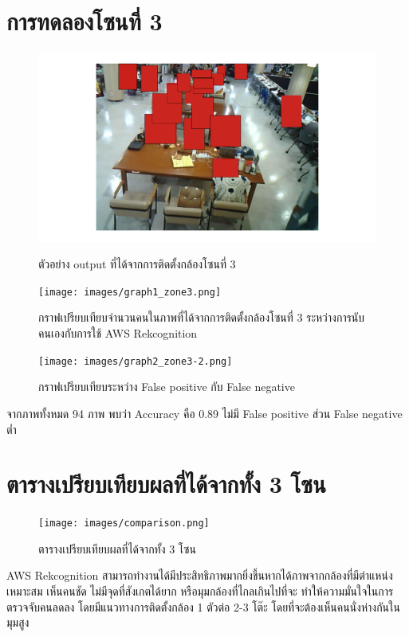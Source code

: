 \section{การทดลองโซนที่ 3}
\begin{figure}[ht]
    \centering
    \includegraphics[width=\textwidth]{images/modified_ESP32-CAM(27).png}
    \caption[ตัวอย่าง output ที่ได้จากการติดตั้งกล้องโซนที่ 3]{ตัวอย่าง output ที่ได้จากการติดตั้งกล้องโซนที่ 3}
    \label{fig:output3}
    \centering
    \texttt{[image: images/graph1\_zone3.png]}
    \caption[กราฟเปรียบเทียบจำนวนคนในภาพที่ได้จากการติดตั้งกล้องโซนที่ 3 ระหว่างการนับคนเองกับการใช้ AWS Rekcognition]{กราฟเปรียบเทียบจำนวนคนในภาพที่ได้จากการติดตั้งกล้องโซนที่ 3 ระหว่างการนับคนเองกับการใช้ AWS Rekcognition}
    \label{fig:graph1-3}
\end{figure}
\newpage
\begin{figure}[ht]
    \centering
    \texttt{[image: images/graph2\_zone3-2.png]}
    \caption[กราฟเปรียบเทียบระหว่าง False positive กับ False negative]{กราฟเปรียบเทียบระหว่าง False positive กับ False negative}
    \label{fig:graph2-3}
\end{figure}
จากภาพทั้งหมด 94 ภาพ พบว่า Accuracy คือ 0.89 ไม่มี False positive ส่วน False negative ต่ำ

\newpage
\section{ตารางเปรียบเทียบผลที่ได้จากทั้ง 3 โซน}
\begin{figure}[ht]
    \centering
    \texttt{[image: images/comparison.png]}
    \caption[comparison]{ตารางเปรียบเทียบผลที่ได้จากทั้ง 3 โซน}
    \label{fig:comparison}
\end{figure}
AWS Rekcognition สามารถทํางานได้มีประสิทธิภาพมากยิ่งขึ้นหากได้ภาพจากกล้องที่มีตําแหน่งเหมาะสม เห็นคนชัด ไม่มีจุดที่สังเกตได้ยาก หรือมุมกล้องที่ไกลเกินไปที่จะ
ทําให้ความมั่นใจในการตรวจจับคนลดลง โดยมีแนวทางการติดตั้งกล้อง 1 ตัวต่อ 2-3 โต๊ะ
โดยที่จะต้องเห็นคนนั่งห่างกันในมุมสูง

